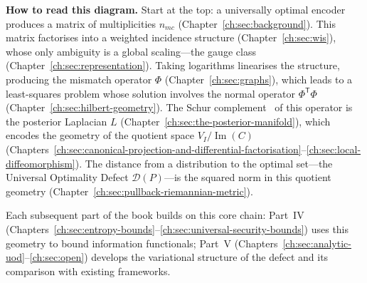 \vspace{1em}

\noindent\textbf{How to read this diagram.}
Start at the top: a universally optimal encoder produces a matrix of
multiplicities $n_{mc}$ (Chapter~\ref{ch:sec:background}).  This matrix factorises into a
weighted incidence structure (Chapter~\ref{ch:sec:wis}), whose only ambiguity is a
global scaling---the gauge class (Chapter~\ref{ch:sec:representation}).  Taking logarithms
linearises the structure, producing the mismatch operator $\Phi$
(Chapter~\ref{ch:sec:graphs}), which leads to a least-squares problem whose solution
involves the normal operator $\Phi^{\mathsf T}\Phi$ (Chapter~\ref{ch:sec:hilbert-geometry}).
The Schur complement~\cite{zhang2005schur} of this operator is the posterior Laplacian $L$
(Chapter~\ref{ch:sec:the-posterior-manifold}), which encodes the geometry of the quotient space
$V_I/\operatorname{Im}(C)$ (Chapters~\ref{ch:sec:canonical-projection-and-differential-factorisation}--\ref{ch:sec:local-diffeomorphism}).  The distance from a
distribution to the optimal set---the Universal Optimality Defect
$\mathcal D(P)$---is the squared norm in this quotient geometry
(Chapter~\ref{ch:sec:pullback-riemannian-metric}).

\vspace{1em}

\noindent Each subsequent part of the book builds on this core chain:
Part~IV (Chapters~\ref{ch:sec:entropy-bounds}--\ref{ch:sec:universal-security-bounds}) uses this geometry to bound information
functionals; Part~V (Chapters~\ref{ch:sec:analytic-uod}--\ref{ch:sec:open}) develops the variational
structure of the defect and its comparison with existing frameworks.
